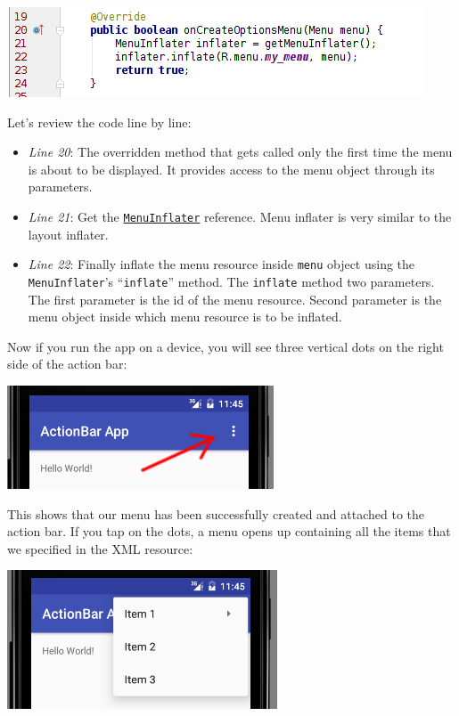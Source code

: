 \begin{center}
	\includegraphics[scale=0.4]{chapters/ch07/images/44}
\end{center}

Let's review the code line by line:

\begin{itemize}
	\item \textit{Line 20}: The overridden method that gets called only the first time the menu is about to be displayed. It provides access to the menu object through its parameters. 
	
	\item \textit{Line 21}: Get the \href{https://developer.android.com/reference/android/view/MenuInflater.html}{\texttt{MenuInflater}} reference. Menu inflater is very similar to the layout inflater. 

	\item \textit{Line 22}: Finally inflate the menu resource inside \texttt{menu} object using the \texttt{MenuInflater}'s ``\texttt{inflate}'' method. The \texttt{inflate} method two parameters. The first parameter is the id of the menu resource. Second parameter is the menu object inside which menu resource is to be inflated.
\end{itemize}

Now if you run the app on a device, you will see three vertical dots on the right side of the action bar:

\begin{center}
	\includegraphics[scale=0.4]{chapters/ch07/images/45}
\end{center}

This shows that our menu has been successfully created and attached to the action bar. If you tap on the dots, a menu opens up containing all the items that we specified in the XML resource:

\begin{center}
	\includegraphics[scale=0.4]{chapters/ch07/images/46}
\end{center}


